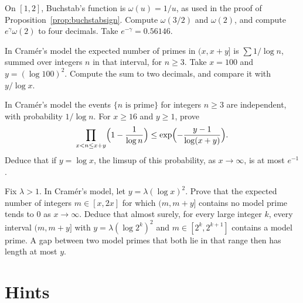 \begin{exercise}[$\star$]\label{ex:v15-02-1}
On \([1,2]\), Buchstab's function is \(\omega(u)=1/u\), as used in the proof of Proposition~\ref{prop:buchstabsign}. Compute \(\omega(3/2)\) and \(\omega(2)\), and compute \(e^{\gamma}\omega(2)\) to four decimals. Take \(e^{-\gamma}=0.56146\).
\end{exercise}

\begin{exercise}[$\star$]\label{ex:v15-02-2}
In Cram\'er's model the expected number of primes in \((x,x+y]\) is \(\sum 1/\log n\), summed over integers \(n\) in that interval, for \(n\ge3\). Take \(x=100\) and \(y=(\log100)^2\). Compute the sum to two decimals, and compare it with \(y/\log x\).
\end{exercise}

\begin{exercise}[$\star\star$]\label{ex:v15-02-3}
In Cram\'er's model the events \(\{n\text{ is prime}\}\) for integers \(n\ge3\) are independent, with probability \(1/\log n\). For \(x\ge16\) and \(y\ge1\), prove
\[
\prod_{x<n\le x+y}\Bigl(1-\frac1{\log n}\Bigr)
\le\exp\Bigl(-\frac{y-1}{\log(x+y)}\Bigr).
\]
Deduce that if \(y=\log x\), the limsup of this probability, as \(x\to\infty\), is at most \(e^{-1}\).
\end{exercise}

\begin{exercise}[$\star\star\star$]\label{ex:v15-02-4}
Fix \(\lambda>1\). In Cram\'er's model, let \(y=\lambda(\log x)^2\). Prove that the expected number of integers \(m\in[x,2x]\) for which \((m,m+y]\) contains no model prime tends to \(0\) as \(x\to\infty\). Deduce that almost surely, for every large integer \(k\), every interval \((m,m+y]\) with \(y=\lambda(\log 2^k)^2\) and \(m\in[2^k,2^{k+1}]\) contains a model prime. A gap between two model primes that both lie in that range then has length at most \(y\).
\end{exercise}

\section{Hints}

